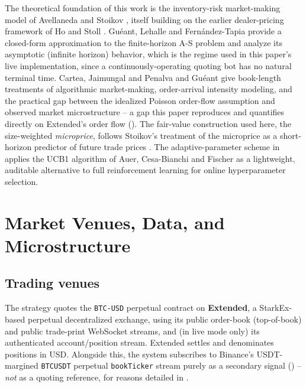 \documentclass[11pt,a4paper]{article}
\begin{document}
The theoretical foundation of this work is the inventory-risk market-making model of Avellaneda
and Stoikov \cite{avellaneda2008}, itself building on the earlier dealer-pricing framework of Ho
and Stoll \cite{hostoll1981}. Guéant, Lehalle and Fernández-Tapia \cite{gueant2013} provide a
closed-form approximation to the finite-horizon A-S problem and analyze its asymptotic (infinite
horizon) behavior, which is the regime used in this paper's live implementation, since a
continuously-operating quoting bot has no natural terminal time. Cartea, Jaimungal and Penalva
\cite{cartea2015} and Guéant \cite{gueant2016} give book-length treatments of algorithmic
market-making, order-arrival intensity modeling, and the practical gap between the idealized
Poisson order-flow assumption and observed market microstructure -- a gap this paper reproduces
and quantifies directly on Extended's order flow (). The fair-value construction
used here, the size-weighted \emph{microprice}, follows Stoikov's treatment of the microprice as
a short-horizon predictor of future trade prices \cite{stoikov2018}. The adaptive-parameter
scheme in  applies the UCB1 algorithm of Auer, Cesa-Bianchi and Fischer
\cite{auer2002} as a lightweight, auditable alternative to full reinforcement learning for online
hyperparameter selection.

\section{Market Venues, Data, and Microstructure}
\label{sec:data}

\subsection{Trading venues}

The strategy quotes the \texttt{BTC-USD} perpetual contract on \textbf{Extended}, a StarkEx-based
perpetual decentralized exchange, using its public order-book (top-of-book) and public
trade-print WebSocket streams, and (in live mode only) its authenticated account/position stream.
Extended settles and denominates positions in USD. Alongside this, the system subscribes to
Binance's USDT-margined \texttt{BTCUSDT} perpetual \texttt{bookTicker} stream purely as a
secondary signal () -- \emph{not} as a quoting reference, for reasons detailed
in .
\end{document}
